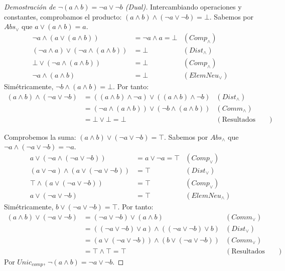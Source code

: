 \documentclass[12pt,a4paper]{article}
\begin{document}
{\begin{proof}[Demostración de $\neg (a \wedge b) = \neg a \vee \neg b$ (Dual)]
Intercambiando operaciones y constantes, comprobamos el producto: $(a \wedge b) \wedge (\neg a \vee \neg b) = \bot$.
Sabemos por $Abs_\vee$ que $a \vee (a \wedge b) = a$.
\begin{align*}
    \neg a \wedge (a \vee (a \wedge b)) &= \neg a \wedge a = \bot & (Comp_\wedge) \\
    (\neg a \wedge a) \vee (\neg a \wedge (a \wedge b)) &= \bot & (Dist_\wedge) \\
    \bot \vee (\neg a \wedge (a \wedge b)) &= \bot & (Comp_\wedge) \\
    \neg a \wedge (a \wedge b) &= \bot & (ElemNeu_\vee)
\end{align*}
Simétricamente, $\neg b \wedge (a \wedge b) = \bot$.
Por tanto:
\begin{align*}
    (a \wedge b) \wedge (\neg a \vee \neg b) &= ((a \wedge b) \wedge \neg a) \vee ((a \wedge b) \wedge \neg b) & (Dist_\wedge) \\
    &= (\neg a \wedge (a \wedge b)) \vee (\neg b \wedge (a \wedge b)) & (Comm_\wedge) \\
    &= \bot \vee \bot = \bot & (\text{Resultados anteriores})
\end{align*}

Comprobemos la suma: $(a \wedge b) \vee (\neg a \vee \neg b) = \top$.
Sabemos por $Abs_\wedge$ que $\neg a \wedge (\neg a \vee \neg b) = \neg a$.
\begin{align*}
    a \vee (\neg a \wedge (\neg a \vee \neg b)) &= a \vee \neg a = \top & (Comp_\vee) \\
    (a \vee \neg a) \wedge (a \vee (\neg a \vee \neg b)) &= \top & (Dist_\vee) \\
    \top \wedge (a \vee (\neg a \vee \neg b)) &= \top & (Comp_\vee) \\
    a \vee (\neg a \vee \neg b) &= \top & (ElemNeu_\wedge)
\end{align*}
Simétricamente, $b \vee (\neg a \vee \neg b) = \top$.
Por tanto:
\begin{align*}
    (a \wedge b) \vee (\neg a \vee \neg b) &= (\neg a \vee \neg b) \vee (a \wedge b) & (Comm_\vee) \\
    &= ((\neg a \vee \neg b) \vee a) \wedge ((\neg a \vee \neg b) \vee b) & (Dist_\vee) \\
    &= (a \vee (\neg a \vee \neg b)) \wedge (b \vee (\neg a \vee \neg b)) & (Comm_\vee) \\
    &= \top \wedge \top = \top & (\text{Resultados anteriores})
\end{align*}
Por $Unic_{comp}$, $\neg (a \wedge b) = \neg a \vee \neg b$.
\end{proof}

}
\end{document}
